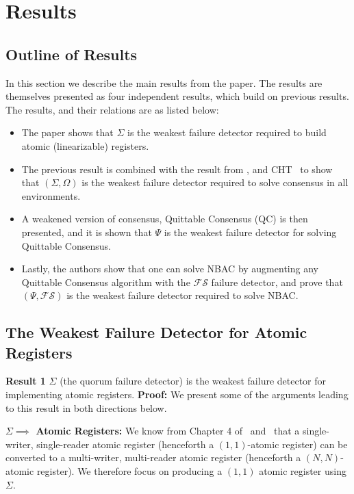 \section{Results}
\subsection{Outline of Results}
In this section we describe the main results from the paper. The results are themselves presented as four independent
results, which build on previous results. The results, and their relations are as listed below:
\begin{itemize}
\item The paper shows that $\Sigma$ is the weakest failure detector required to build atomic (linearizable) registers.
\item The previous result is combined with the result from \cite{lo1994using}, and CHT~\cite{chandra1996weakest} to show
that $(\Sigma, \Omega)$ is the weakest failure detector required to solve consensus in all environments.
\item A weakened version of consensus, Quittable Consensus (QC) is then presented, and it is shown that $\Psi$ is the weakest
failure detector for solving Quittable Consensus.
\item Lastly, the  authors show that one can solve NBAC by augmenting any Quittable Consensus algorithm with the
$\mathcal{FS}$ failure detector, and prove that $(\Psi, \mathcal{FS})$ is the weakest failure detector required to solve
NBAC.
\end{itemize}

\subsection{The Weakest Failure Detector for Atomic Registers}
\textbf{Result 1} $\Sigma$ (the quorum failure detector) is the weakest failure detector for implementing atomic
registers.
\textbf{Proof:} We present some of the arguments leading to this result in both directions below.

\textbf{$\Sigma \implies$ Atomic Registers:} We know from Chapter 4 of~\cite{cachin2011introduction}
and~\cite{vitanyi1986atomic} that a single-writer, single-reader atomic register (henceforth a $(1,1)$-atomic register)
can be converted to a multi-writer, multi-reader atomic register (henceforth a $(N, N)$-atomic register). We therefore
focus on producing a $(1, 1)$ atomic register using $\Sigma$. 

